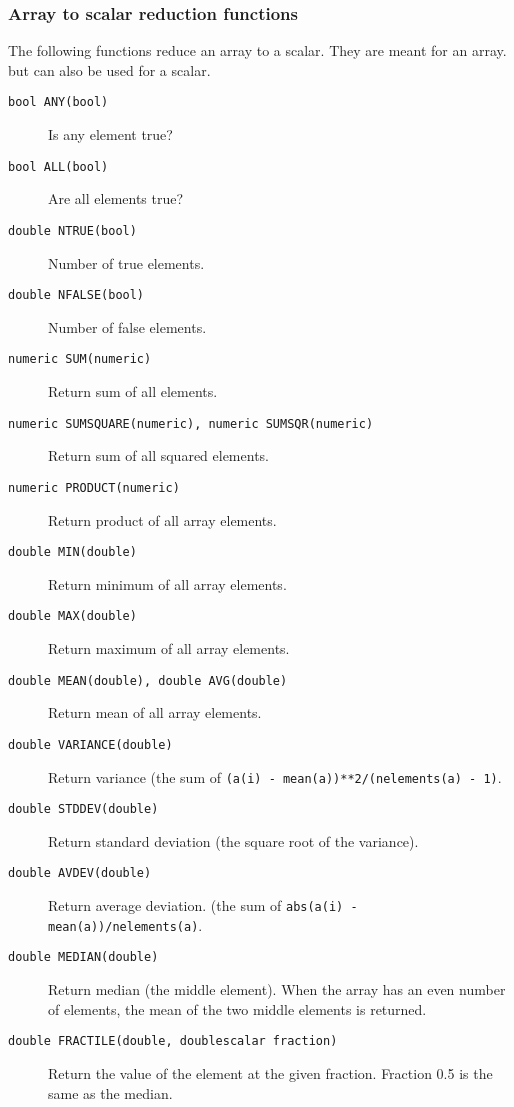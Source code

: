 \subsubsection{Array to scalar reduction functions}
The following functions reduce an array to a scalar.
They are meant for an array. but can also be used for a scalar.
\begin{description}
  \item[ \texttt{bool ANY(bool)}] Is any element true?
  \item[ \texttt{bool ALL(bool)}] Are all elements true?
  \item[ \texttt{double NTRUE(bool)}] Number of true elements.
  \item[ \texttt{double NFALSE(bool)}] Number of false elements.
  \item[ \texttt{numeric SUM(numeric)}] Return sum of all elements.
  \item[ \texttt{numeric SUMSQUARE(numeric), numeric SUMSQR(numeric)}]
       Return sum of all squared elements.
  \item[ \texttt{numeric PRODUCT(numeric)}] Return product
    of all array elements.
  \item[ \texttt{double MIN(double)}] Return minimum
    of all array elements.
  \item[ \texttt{double MAX(double)}] Return maximum
    of all array elements.
  \item[ \texttt{double MEAN(double), double AVG(double)}]
    Return mean of all array elements.
  \item[ \texttt{double VARIANCE(double)}] Return variance
    (the sum of \texttt{(a(i) - mean(a))**2/(nelements(a) - 1)}.
  \item[ \texttt{double STDDEV(double)}] Return standard
    deviation (the square root of the variance).
  \item[ \texttt{double AVDEV(double)}] Return average deviation.
    (the sum of \texttt{abs(a(i) - mean(a))/nelements(a)}.
  \item[ \texttt{double MEDIAN(double)}] Return median (the
    middle element).
    When the array has an even number of elements, the mean of
    the two middle elements is returned.
  \item[ \texttt{double FRACTILE(double, doublescalar fraction)}]
       Return the value of the element at the given fraction.
       Fraction 0.5 is the same as the median.
\end{description}

